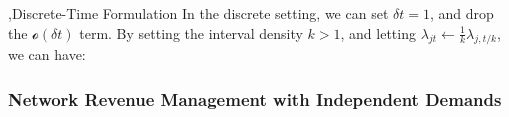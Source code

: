 \documentclass[12pt]{report}
\begin{document}
\sep{Discrete-Time Formulation}
In the discrete setting, we can set $\delta t=1$, and drop the $\mathcal{o}(\delta t)$ term. By setting the interval density $k>1$, and letting $\lambda_{jt}\leftarrow\frac1k\lambda_{j,t/k}$, we can have:

\subsubsection{Network Revenue Management with Independent Demands}
\end{document}
